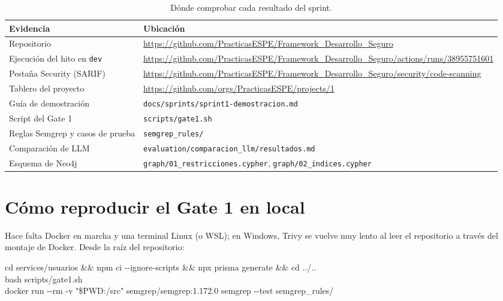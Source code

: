 \documentclass[11pt,a4paper]{report}
\begin{document}
\begin{table}[H]
\centering
\caption{Dónde comprobar cada resultado del sprint.}
\begin{tabularx}{\textwidth}{@{}P{4.0cm}>{\raggedright\arraybackslash\small}X@{}}
\toprule
\textbf{Evidencia} & \textbf{Ubicación}\\
\midrule
Repositorio & \url{https://github.com/PracticasESPE/Framework_Desarrollo_Seguro}\\
Ejecución del hito en \texttt{dev} & \url{https://github.com/PracticasESPE/Framework_Desarrollo_Seguro/actions/runs/38955751601}\\
Pestaña Security (SARIF) & \url{https://github.com/PracticasESPE/Framework_Desarrollo_Seguro/security/code-scanning}\\
Tablero del proyecto & \url{https://github.com/orgs/PracticasESPE/projects/1}\\
Guía de demostración & \texttt{docs/sprints/sprint1-demostracion.md}\\
Script del Gate 1 & \texttt{scripts/gate1.sh}\\
Reglas Semgrep y casos de prueba & \texttt{semgrep\_rules/}\\
Comparación de LLM & \texttt{evaluation/comparacion\_llm/resultados.md}\\
Esquema de Neo4j & \texttt{graph/01\_restricciones.cypher}, \texttt{graph/02\_indices.cypher}\\
\bottomrule
\end{tabularx}
\end{table}

\section*{Cómo reproducir el Gate 1 en local}
Hace falta Docker en marcha y una terminal Linux (o WSL); en Windows, Trivy se vuelve muy lento
al leer el repositorio a través del montaje de Docker. Desde la raíz del repositorio:

\begin{tcolorbox}[colback=white,colframe=grisfw,boxrule=0.4pt,arc=1mm,left=2mm]
\small\ttfamily
cd services/usuarios \&\& npm ci -{}-ignore-scripts \&\& npx prisma generate \&\& cd ../..\\
bash scripts/gate1.sh\\
docker run -{}-rm -v "\$PWD:/src" semgrep/semgrep:1.172.0 semgrep -{}-test semgrep\_rules/
\end{tcolorbox}
\end{document}
